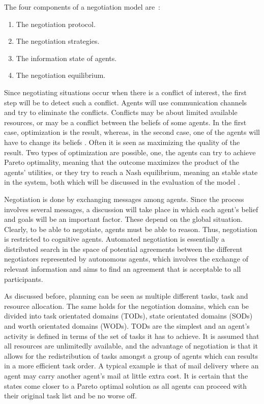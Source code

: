 The four components of a negotiation model are~\citep{fatima2004agenda}:
\begin{enumerate}
	\item The negotiation protocol.
	\item The negotiation strategies.
	\item The information state of agents.
	\item The negotiation equilibrium.
\end{enumerate}

Since negotiating situations occur when there is a conflict of interest, the first step will be to detect such a conflict. Agents will use communication channels and try to eliminate the conflicts. Conflicts may be about limited available resources, or may be a conflict between the beliefs of some agents. In the first case, optimization is the result, whereas, in the second case, one of the agents will have to change its beliefs \citep{shen2003multi}. Often it is seen as maximizing the quality of the result. Two types of optimization are possible, one, the agents can try to achieve Pareto optimality, meaning that the outcome maximizes the product of the agents' utilities, or they try to reach a Nash equilibrium, meaning an stable state in the system, both which will be discussed in the evaluation of the model .

Negotiation is done by exchanging messages among agents. Since the process involves several messages, a discussion will take place in which each agent's belief and goals will be an important factor. These depend on the global situation. Clearly, to be able to negotiate, agents must be able to reason. Thus, negotiation is restricted to cognitive agents. Automated negotiation is essentially a distributed search in the space of potential agreements between the different negotiators represented by autonomous agents, which involves the exchange of relevant information and aims to find an agreement that is acceptable to all participants.

As discussed before, planning can be seen as multiple different tasks, task and resource allocation. The same holds for the negotiation domains, which can be divided into task orientated domains (TODs), state orientated domains (SODs) and worth orientated domains (WODs). TODs are the simplest and an agent's activity is defined in terms of the set of tasks it has to achieve. It is assumed that all resources are unlimitedly available, and the advantage of negotiation is that it allows for the redistribution of tasks amongst a group of agents which can results in a more efficient task order. A typical example is that of mail delivery where an agent may carry another agent's mail at little extra cost. It is certain that the states come closer to a Pareto optimal solution as all agents can proceed with their original task list and be no worse off. 

